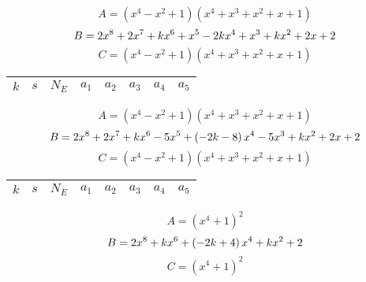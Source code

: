 \documentclass{amsart}
\begin{document}
$$A=(x^4
 - x^2
 + 1)(x^4
 + x^3
 + x^2
 + x
 + 1)$$
$$B=2\*x^8
 + 2\*x^7
 + k\*x^6
 + x^5
 - 2\*k\*x^4
 + x^3
 + k\*x^2
 + 2\*x
 + 2$$
$$C=(x^4
 - x^2
 + 1)(x^4
 + x^3
 + x^2
 + x
 + 1)$$
\begin{longtable}{|l|l|l|lllll|}
\hline
$k$ & $s$ & $N_E$ & $a_1$ & $a_2$ & $a_3$ & $a_4$ & $a_5$\\
\hline
\hline
\end{longtable}
$$A=(x^4
 - x^2
 + 1)(x^4
 + x^3
 + x^2
 + x
 + 1)$$
$$B=2\*x^8
 + 2\*x^7
 + k\*x^6
 - 5\*x^5
 + \left(-2\*k
 - 8\right) \*x^4
 - 5\*x^3
 + k\*x^2
 + 2\*x
 + 2$$
$$C=(x^4
 - x^2
 + 1)(x^4
 + x^3
 + x^2
 + x
 + 1)$$
\begin{longtable}{|l|l|l|lllll|}
\hline
$k$ & $s$ & $N_E$ & $a_1$ & $a_2$ & $a_3$ & $a_4$ & $a_5$\\
\hline
\hline
\end{longtable}
$$A=(x^4
 + 1)^{2}$$
$$B=2\*x^8
 + k\*x^6
 + \left(-2\*k
 + 4\right) \*x^4
 + k\*x^2
 + 2$$
$$C=(x^4
 + 1)^{2}$$
\end{document}
